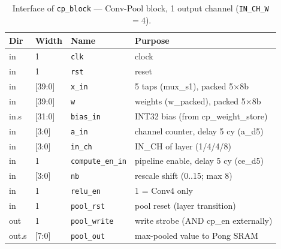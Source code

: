 \begin{table}[t]
\centering
\caption{Interface of \texttt{cp\_block} — Conv-Pool block, 1 output channel
(\texttt{IN\_CH\_W}$=4$).}
\label{tab:if-cp-block}
\small
\setlength{\tabcolsep}{4pt}
\renewcommand{\arraystretch}{1.1}
\begin{tabular}{@{}llll@{}}
\toprule
\textbf{Dir} & \textbf{Width} & \textbf{Name} & \textbf{Purpose} \\
\midrule
in    & 1      & \texttt{clk}            & clock \\
in    & 1      & \texttt{rst}            & reset \\
in    & [39:0] & \texttt{x\_in}          & 5 taps (mux\_s1), packed 5$\times$8b \\
in    & [39:0] & \texttt{w}              & weights (w\_packed), packed 5$\times$8b \\
in.s  & [31:0] & \texttt{bias\_in}       & INT32 bias (from cp\_weight\_store) \\
in    & [3:0]  & \texttt{a\_in}          & channel counter, delay 5 cy (a\_d5) \\
in    & [3:0]  & \texttt{in\_ch}         & IN\_CH of layer (1/4/4/8) \\
in    & 1      & \texttt{compute\_en\_in}& pipeline enable, delay 5 cy (ce\_d5) \\
in    & [3:0]  & \texttt{nb}             & rescale shift (0..15; max 8) \\
in    & 1      & \texttt{relu\_en}       & 1 = Conv4 only \\
in    & 1      & \texttt{pool\_rst}      & pool reset (layer transition) \\
out   & 1      & \texttt{pool\_write}    & write strobe (AND cp\_en externally) \\
out.s & [7:0]  & \texttt{pool\_out}      & max-pooled value to Pong SRAM \\
\bottomrule
\end{tabular}
\end{table}


